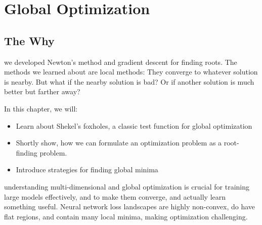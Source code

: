



\chapter{Global Optimization}



\section{The Why}
 

 we developed Newton's method and gradient descent for finding roots.
The methods we learned about are local methods: They converge to whatever solution is nearby.
But what if the nearby solution is bad? Or if another solution is much better but farther away?

 In this chapter, we will:
\begin{itemize}
    \item Learn about Shekel's foxholes, a classic test function for global optimization
    \item Shortly show, how we can formulate an optimization problem as a root-finding problem.
    \item Introduce strategies for finding global minima
\end{itemize}



 understanding multi-dimensional and global optimization is crucial for training 
large models effectively, and to make them converge, and actually learn something useful. Neural network loss 
landscapes \cite{VisualizeLandscape} are highly non-convex, do have flat regions, and contain many local minima, 
making optimization challenging.






